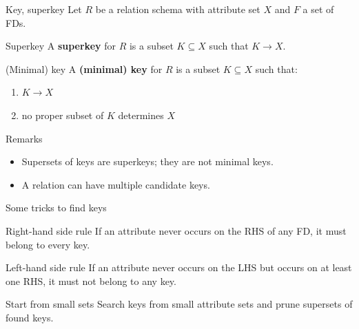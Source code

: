 \documentclass[10pt,aspectratio=169]{beamer}
\begin{document}
\begin{frame}{Key, superkey}
Let \(R\) be a relation schema with attribute set \(X\) and \(F\) a set of FDs.
\begin{block}{Superkey}
A \textbf{superkey} for \(R\) is a subset \(K \subseteq X\) such that \(K \rightarrow X\).
\end{block}
\begin{block}{(Minimal) key}
A \textbf{(minimal) key} for \(R\) is a subset \(K \subseteq X\) such that:
\begin{enumerate}
  \item \(K \rightarrow X\)
  \item no proper subset of \(K\) determines \(X\)
\end{enumerate}
\end{block}
\begin{alertblock}{Remarks}
\begin{itemize}
  \item Supersets of keys are superkeys; they are not minimal keys.
  \item A relation can have multiple candidate keys.
\end{itemize}
\end{alertblock}
\end{frame}

\begin{frame}{Some tricks to find keys}
\begin{block}{Right-hand side rule}
If an attribute never occurs on the RHS of any FD, it must belong to every key.
\end{block}
\begin{block}{Left-hand side rule}
If an attribute never occurs on the LHS but occurs on at least one RHS, it must not belong to any key.
\end{block}
\begin{block}{Start from small sets}
Search keys from small attribute sets and prune supersets of found keys.
\end{block}
\end{frame}
\end{document}
